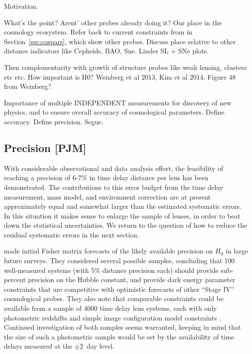 Motivation.



What's the point? Arent' other probes already doing it? Our place in the
cosmology ecosystem. Refer back to current constraints from \citet{Suy++13} in
Section~\ref{sec:cospars}, which show other probes.
Discuss place relative to other distance indicators
like Cepheids, BAO, Sne. Linder SL + SNe plots.

Then complementarity with growth of structure
probes like weak lensing, clusters etc etc. How important is H0?
Weinberg et al 2013, Kim et al 2014. Figure 48 from Weinberg?

Importance of multiple INDEPENDENT measurements for discovery of new
physics, and to ensure overall accuracy of cosmological parameters.
Define accuracy. Define precision. Segue.



\subsection{Precision [PJM]}

With considerable observational and data analysis effort, the
feasibility  of reaching a precision  of 6-7\% in time delay distance
per lens has been demonstrated. The contributions to this error budget
from  the time delay measurement, mass model, and environment correction
are at present approximately equal and somewhat larger than the
estimated systematic errors. In this situation it makes sense to enlarge
the sample of lenses, in order to beat down the statistical
uncertainties. We return to the question of how to reduce the  residual
systematic errors in the next section.

\citet{C+M09b} made initial Fisher matrix forecasts of the likely
available precision on $H_0$ in large future surveys. They considered
several possible samples, concluding that 100 well-measured systems
(with 5\% distance precision each) should provide sub-percent precision
on the Hubble constant, and provide  dark energy parameter constraints
that are competitive with optimistic forecasts of other ``Stage IV''
cosmological probes. They also note that comparable constraints could be
available from a sample of 4000 time delay lens systems, each with only
photometric redshifts and simple image configuration model constraints
\citep[following][]{Ogu07b}.  Continued investigation of both samples
seems warranted, keeping in mind that the size of such a photometric
sample would be set by the availability of time delays measured at the
$\pm 2$~day level.


